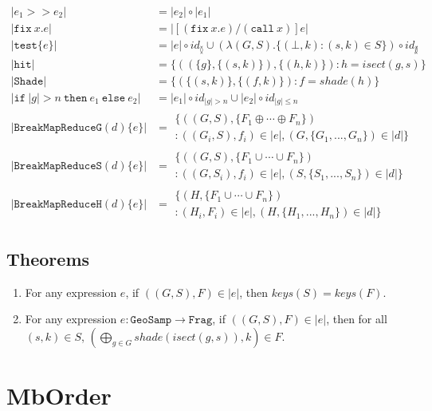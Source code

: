 \documentclass{article}
\newcommand {\chain}{\mathtt{>>}}
\newcommand {\fix}{\mathtt{fix}}
\newcommand {\call}{\mathtt{call}}
\newcommand {\test}{\mathtt{test}}
\newcommand {\isect}{\mathtt{hit}}
\newcommand {\shade}{\mathtt{Shade}}
\newcommand {\bmrg}{\mathtt{BreakMapReduceG}}
\newcommand {\bmrs}{\mathtt{BreakMapReduceS}}
\newcommand {\bmrh}{\mathtt{BreakMapReduceH}}
\newcommand {\geosamp}{\mathtt{GeoSamp}}
\newcommand {\frag}{\mathtt{Frag}}
\newcommand {\normalSpacing}{\setlength{\jot}{1ex}}
\begin{document}
\begin{align}
|e_1 \chain e_2 | &= |e_2| \circ |e_1| \\
|\fix~x. e| &= |[(\fix~x. e)/(\call~x)]e| \\
|\test\{e\}| &=  |e| \circ id_\between \cup  (\lambda (G,S).\{(\bot,k):(s,k)\in S\}) \circ id_{\not \between} \\
|\isect| &= \{((\{g\},\{(s,k)\}), \{(h,k)\}) : h = isect(g,s)\}\\
|\shade| &= \{(\{(s,k)\}, \{(f,k)\}) : f = shade(h)\} \\
| \mathtt{if~}|g| > n \mathtt{~then~} e_1 \mathtt{~else~} e_2| &=  |e_1| \circ id_{|g|>n} \cup  |e_2| \circ id_{|g|\le n}\\
|\bmrg (d) \{ e \} | &= \begin{array}{l} \{((G,S), \{F_1 \oplus \cdots \oplus F_n\}) \\
	: ((G_i,S), f_i) \in |e|, (G, \{G_1,...,G_n\}) \in |d| \} \end{array}\\
|\bmrs (d) \{ e \} | &= \begin{array}{l} \{((G,S), \{F_1 \cup \cdots \cup F_n\}) \\
	: ((G,S_i), f_i) \in |e|, (S, \{S_1,...,S_n\}) \in |d| \} \end{array} \\
|\bmrh (d) \{ e \} | &= \begin{array}{l} \{(H, \{F_1 \cup \cdots \cup F_n\}) \\
	: (H_i, F_i) \in |e|, (H, \{H_1,...,H_n\}) \in |d| \} \end{array}
\end{align}

\subsection{Theorems}

\begin{enumerate}
\item For any expression $e$, if $((G,S),F) \in |e|$, then $keys(S) = keys(F)$.
\item For any expression $e:\geosamp \to \frag$, if $((G,S),F) \in |e|$, then for all $(s,k) \in S$, $(\bigoplus_{g\in G} shade(isect(g,s)),k) \in F$.
\end{enumerate}



\section{MbOrder}
\normalSpacing
\end{document}
